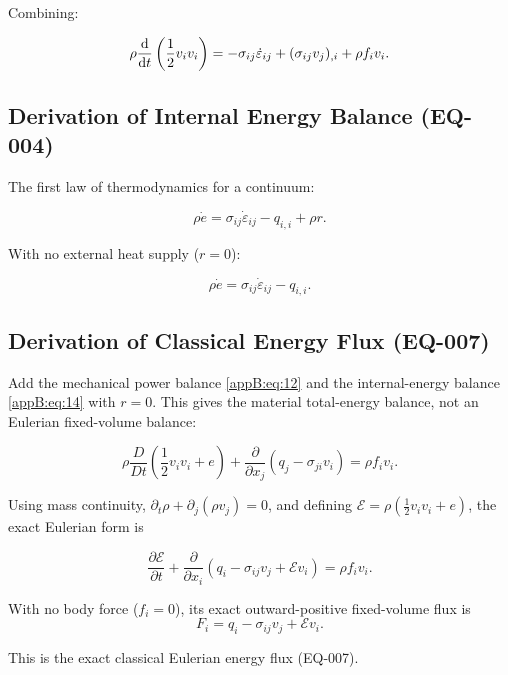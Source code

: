 Combining:

\begin{equation}
\rho \frac{\mathrm{d}}{\mathrm{d} t}\left(\frac{1}{2}v_i v_i\right)
=
-\sigma_{ij}\dot{\varepsilon}_{ij} + (\sigma_{ij}v_j)_{,i} + \rho f_i v_i.
\label{appB:eq:12}
\end{equation}

\subsection{Derivation of Internal Energy Balance (EQ-004)}

The first law of thermodynamics for a continuum:

\begin{equation}
\rho \dot{e} = \sigma_{ij}\dot{\varepsilon}_{ij} - q_{i,i} + \rho r.
\label{appB:eq:13}
\end{equation}

With no external heat supply ($r=0$):

\begin{equation}
\rho \dot{e} = \sigma_{ij}\dot{\varepsilon}_{ij} - q_{i,i}.
\label{appB:eq:14}
\end{equation}

\subsection{Derivation of Classical Energy Flux (EQ-007)}

Add the mechanical power balance \eqref{appB:eq:12} and the internal-energy balance \eqref{appB:eq:14} with $r=0$. This gives the material total-energy balance, not an Eulerian fixed-volume balance:

\begin{equation}
\rho\frac{D}{Dt}\left(\frac12v_iv_i+e\right)
+\frac{\partial}{\partial x_j}(q_j-\sigma_{ji}v_i)
=\rho f_iv_i.
\label{appB:eq:16}
\end{equation}

Using mass continuity, $\partial_t\rho+\partial_j(\rho v_j)=0$, and defining $\mathcal{E}=\rho(\tfrac12v_iv_i+e)$, the exact Eulerian form is

\begin{equation}
\frac{\partial\mathcal{E}}{\partial t}
+\frac{\partial}{\partial x_i}\left(q_i-\sigma_{ij}v_j+\mathcal{E}v_i\right)
=\rho f_iv_i.
\label{appB:eq:17}
\end{equation}

With no body force ($f_i=0$), its exact outward-positive fixed-volume flux is
\begin{equation}
F_i=q_i-\sigma_{ij}v_j+\mathcal{E}v_i.
\label{appB:eq:18}
\end{equation}

This is the exact classical Eulerian energy flux (EQ-007).

